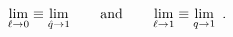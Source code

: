 \begin{equation}
\lim_{\ell \rightarrow 0}\equiv \lim_{\hat{q}\rightarrow 1}\qquad \text{%
and\qquad }\lim_{\ell \rightarrow 1}\equiv \lim_{q\rightarrow 1}~.
\end{equation}%
